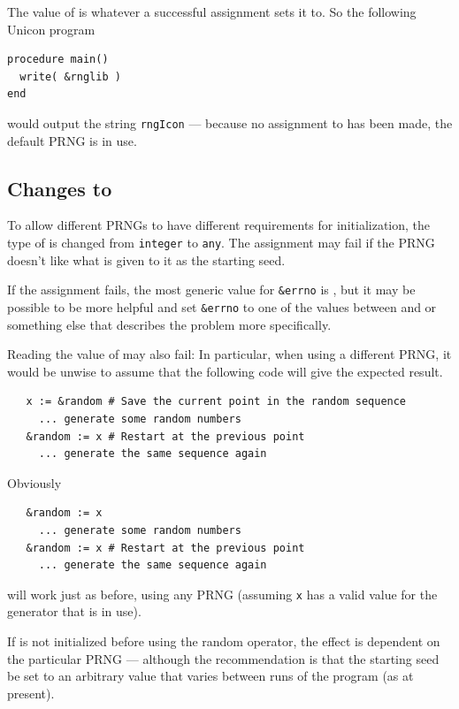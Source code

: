 \documentclass[letterpaper,12pt]{article}
\begin{document}
The value of \rndlibkwd is whatever a successful assignment sets it to. So
the following Unicon program
\begin{verbatim}
procedure main()
  write( &rnglib )
end
\end{verbatim}
would output the string \texttt{rngIcon} --- because no assignment to
\rndlibkwd has been made, the default PRNG is in use.

\subsection{Changes to \rndkwd}
To allow different PRNGs to have different requirements for
initialization, the type of \rndkwd is changed from \texttt{integer}
to \texttt{any}. The assignment may fail if the PRNG doesn't like what is given to it
as the starting seed.

If the assignment fails, the most generic value for \texttt{\&errno} is
,
but it may be possible to be more helpful and set \texttt{\&errno} to one
of the values between 
and  or something else that
describes the problem more specifically.

Reading the value of \rndkwd may also fail:
In particular, when using a different PRNG, it would be unwise to assume that the following
code will give the expected result.
\begin{verbatim}
   x := &random # Save the current point in the random sequence
     ... generate some random numbers
   &random := x # Restart at the previous point
     ... generate the same sequence again
\end{verbatim}

\begin{samepage}
\noindent
 Obviously
\begin{verbatim}
   &random := x
     ... generate some random numbers
   &random := x # Restart at the previous point
     ... generate the same sequence again
\end{verbatim}
will work just as before, using any PRNG (assuming \texttt{x} has a valid
value for the generator that is in use).
\end{samepage}

If \rndkwd is not initialized before using the random operator, the
effect is dependent on the particular PRNG --- although the
recommendation is that the starting seed be set to an arbitrary value
that varies between runs of the program (as at present).
\end{document}
